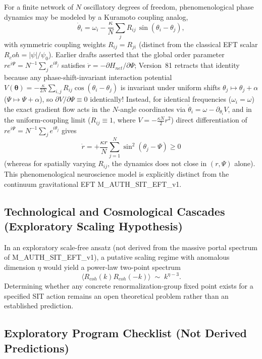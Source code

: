 \documentclass[american,11pt,letterpaper]{article}
\newcommand{\Rcoh}{R_{\mathrm{coh}}}
\def\mathcal#1{#1}%
\def\mathrm#1{#1}%
\def\texttt#1{#1}%
\def\Rcoh{R_coh}%
\begin{document}
For a finite network of $N$ oscillatory degrees of freedom, phenomenological phase dynamics may be modeled by a Kuramoto coupling analog,
\[
\dot{\theta}_{i}
   = \omega_{i}
   - \frac{\kappa}{N}\sum_{j} 
     R_{ij}\,\sin(\theta_{i}-\theta_{j}),
\tag{A5}\label{A5}
\]
with symmetric coupling weights $R_{ij} = R_{ji}$ (distinct from the classical EFT scalar $\Rcoh = |\psi|/\psi_0$). Earlier drafts asserted that the global order parameter $r e^{i\Psi} = N^{-1}\sum_j e^{i\theta_j}$ satisfies $\dot{r} = -\partial\mathcal{H}_{\mathrm{net}}/\partial\Psi$; Version~81 retracts that identity because any phase-shift-invariant interaction potential $\mathcal{V}(\boldsymbol{\theta}) = -\frac{\kappa}{2N}\sum_{i,j} R_{ij}\cos(\theta_i - \theta_j)$ is invariant under uniform shifts $\theta_j \mapsto \theta_j + \alpha$ ($\Psi \mapsto \Psi + \alpha$), so $\partial\mathcal{V}/\partial\Psi \equiv 0$ identically! Instead, for identical frequencies ($\omega_i = \omega$) the exact gradient flow acts in the $N$-angle coordinates via $\dot{\theta}_i = \omega - \partial_{\theta_i}\mathcal{V}$, and in the uniform-coupling limit ($R_{ij} \equiv 1$, where $\mathcal{V} = -\frac{\kappa N}{2} r^2$) direct differentiation of $r e^{i\Psi} = N^{-1}\sum_j e^{i\theta_j}$ gives
\begin{equation}
\dot{r} = +\frac{\kappa r}{N}\sum_{j=1}^N \sin^2(\theta_j - \Psi) \ge 0
\label{eq:kuramoto_order_param_corrected}
\end{equation}
(whereas for spatially varying $R_{ij}$, the dynamics does not close in $(r, \Psi)$ alone). This phenomenological neuroscience model is explicitly distinct from the continuum gravitational EFT \texttt{M\_AUTH\_SIT\_EFT\_v1}.

\subsection{Technological and Cosmological Cascades (Exploratory Scaling Hypothesis)}

In an exploratory scale-free ansatz (not derived from the massive portal spectrum of \texttt{M\_AUTH\_SIT\_EFT\_v1}), a putative scaling regime with anomalous dimension $\eta$ would yield a power-law two-point spectrum
\[
\langle R_{\mathrm{coh}}(k)R_{\mathrm{coh}}(-k)\rangle 
   \;\sim\; k^{\eta-3}.
\tag{A6}\label{A6}
\]
Determining whether any concrete renormalization-group fixed point exists for a specified SIT action remains an open theoretical problem rather than an established prediction.

\subsection{Exploratory Program Checklist (Not Derived Predictions)}
\end{document}

